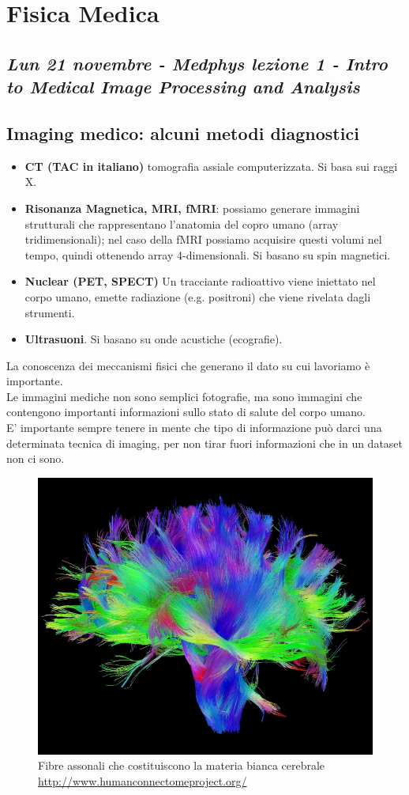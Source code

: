 \chapter{Fisica Medica}


\section{\textit{Lun 21 novembre - Medphys lezione 1 - Intro to Medical Image Processing and Analysis}}
\section{Imaging medico: alcuni metodi diagnostici}

\begin{itemize}
	\item \textbf{CT (TAC in italiano)} tomografia assiale computerizzata. Si basa sui raggi X.
	\item \textbf{Risonanza Magnetica, MRI, fMRI}: possiamo generare immagini strutturali che rappresentano l'anatomia del copro umano (array tridimensionali); nel caso della fMRI possiamo acquisire questi volumi nel tempo, quindi ottenendo array 4-dimensionali.  Si basano su spin magnetici.
	\item \textbf{Nuclear (PET, SPECT)} Un tracciante radioattivo viene iniettato nel corpo umano, emette radiazione (e.g. positroni) che viene rivelata dagli strumenti.
	\item \textbf{Ultrasuoni}. Si basano su onde acustiche (ecografie).
\end{itemize}

La conoscenza dei meccanismi fisici che generano il dato su cui lavoriamo è importante.\\
Le immagini mediche non sono semplici fotografie, ma sono immagini che contengono importanti informazioni sullo stato di salute del corpo umano.\\ E' importante sempre tenere in mente che tipo di informazione può darci una determinata tecnica di imaging, per non tirar fuori informazioni che in un dataset non ci sono.

\begin{figure}[ht]
	\centering
	\includegraphics[width=0.45\linewidth]{figure_med/White-Matter-Fibers.jpg}
	\caption{Fibre assonali che costituiscono la materia bianca cerebrale \url{http://www.humanconnectomeproject.org/}}
\end{figure}
\FloatBarrier

